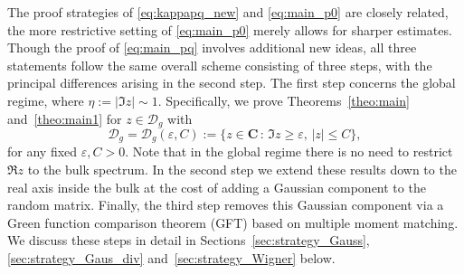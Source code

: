 \documentclass[10pt]{amsart}
\numberwithin{equation}{section}
\newcommand{\C}{\mathbf{C}}
\begin{document}
The proof strategies of \eqref{eq:kappapq_new} and \eqref{eq:main_p0} are closely related, the more restrictive setting of \eqref{eq:main_p0} merely allows for sharper estimates. Though the proof of \eqref{eq:main_pq} involves additional new ideas, all three statements follow the same overall scheme consisting of three steps, with the principal differences arising in the second step. The first step concerns the global regime, where $\eta:=|\Im z|\sim 1$. Specifically, we prove Theorems~\ref{theo:main} and~\ref{theo:main1} for $z\in\mathcal{D}_g$ with
\begin{equation}
\mathcal{D}_g=\mathcal{D}_g(\varepsilon,C):=\{z\in\C\,:\, \Im z\ge \varepsilon,\, |z|\le C\},
\label{eq:def_D_global}
\end{equation} 
for any fixed $\varepsilon,C>0$. Note that in the global regime there is no need to restrict $\Re z$ to the bulk spectrum. In the second step we extend these results down to the real axis inside the bulk at the cost of adding a Gaussian component to the random matrix. Finally, the third step removes this Gaussian component via a Green function comparison theorem (GFT) based on multiple moment matching. We discuss these steps in detail in Sections~\ref{sec:strategy_Gauss}, \ref{sec:strategy_Gaus_div} and~\ref{sec:strategy_Wigner} below.
 
\end{document}
